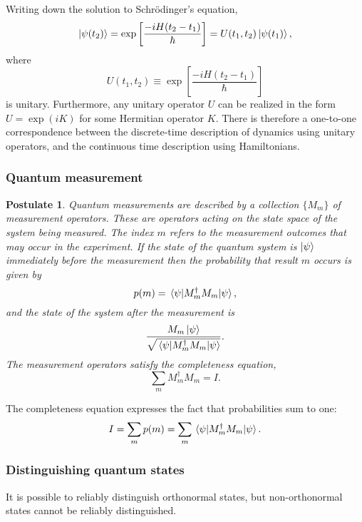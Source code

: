 \documentclass{article}
\numberwithin{theorem}{section}
\numberwithin{corollary}{section}
\newtheorem{postulate}{Postulate}
\numberwithin{postulate}{section}
\begin{document}
Writing down the solution to Schr\"{o}dinger's equation, \[
  \ket{\psi(t_2)} = \exp\left[\frac{-iH(t_2 - t_1)}{\hbar}\right] =
  U(t_1, t_2)\ket{\psi(t_1)},
\] where \[
  U(t_1, t_2) \equiv \exp\left[\frac{-iH(t_2 - t_1)}{\hbar}\right]
\] is unitary. Furthermore, any unitary operator $U$ can be realized in the
form $U = \exp(iK)$ for some Hermitian operator $K$. There is therefore a
one-to-one correspondence between the discrete-time description of dynamics
using unitary operators, and the continuous time description using
Hamiltonians.

\subsubsection{Quantum measurement}

\begin{postulate}
  Quantum measurements are described by a collection $\{M_m\}$ of
  \emph{measurement operators}. These are operators acting on the state space
  of the system being measured. The index $m$ refers to the measurement
  outcomes that may occur in the experiment. If the state of the quantum system
  is $\ket{\psi}$ immediately before the measurement then the probability that
  result $m$ occurs is given by \[
    p(m) = \ev{M_m^{\dagger}M_m}{\psi},
  \] and the state of the system after the measurement is \[
    \frac{M_m\ket{\psi}}{\sqrt{\ev{M_m^{\dagger}M_m}{\psi}}}.
  \] The measurement operators satisfy the \emph{completeness equation}, \[
    \sum_m M_m^{\dagger}M_m = I.
  \]
\end{postulate}

The completeness equation expresses the fact that probabilities sum to one: \[
  I = \sum_m p(m) = \sum_m \ev{M_m^{\dagger}M_m}{\psi}.
\]

\subsubsection{Distinguishing quantum states}

It is possible to reliably distinguish orthonormal states, but non-orthonormal
states cannot be reliably distinguished.
\end{document}
